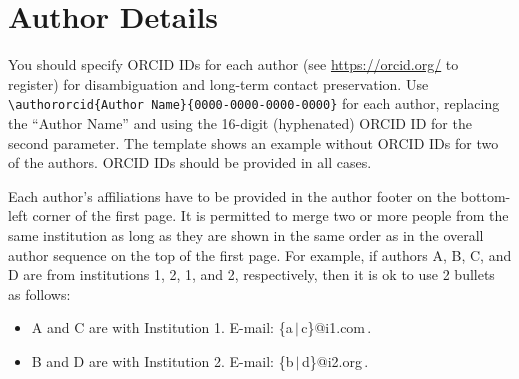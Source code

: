 \section{Author Details}

You should specify ORCID IDs for each author (see \url{https://orcid.org/}  to register) for disambiguation and long-term contact preservation.
Use \verb|\authororcid{Author Name}{0000-0000-0000-0000}| for each author, replacing the ``Author Name'' and using the 16-digit (hyphenated) ORCID ID for the second parameter.
The template shows an example without ORCID IDs for two of the authors.
ORCID IDs should be provided in all cases.

Each author's affiliations have to be provided in the author footer on the bottom-left corner of the first page.
It is permitted to merge two or more people from the same institution as long as they are shown in the same order as in the overall author sequence on the top of the first page.
For example, if authors A, B, C, and D are from institutions 1, 2, 1, and 2, respectively, then it is ok to use 2 bullets as follows:

\begin{itemize}
  \item A and C are with Institution 1. E-mail: \{a\,$|$\,c\}@i1.com\,.

  \item B and D are with Institution 2. E-mail: \{b\,$|$\,d\}@i2.org\,.
\end{itemize}
